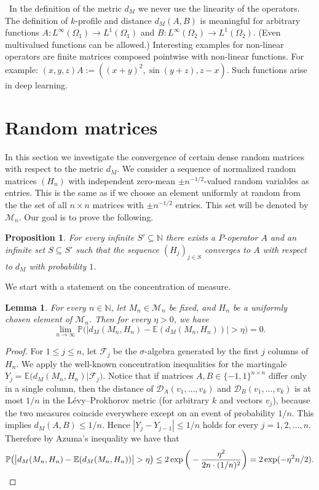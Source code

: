 \documentclass[a4wider]{amsart}
\newtheorem{lemma}[theorem]{Lemma}
\newtheorem{proposition}[theorem]{Proposition}
\theoremstyle{definitionbreak}\newtheorem{D}[theorem]{Definition}
\theoremstyle{definitionbreak}\newtheorem*{D*}{Definition}
\begin{document}
~In the definition of the metric $d_M$ we never use the linearity of the operators. The definition of $k$-profile and distance $d_M(A,B)$ is meaningful for arbitrary functions $A:L^\infty(\Omega_1)\to L^1(\Omega_1)$ and $B:L^\infty(\Omega_2)\to L^1(\Omega_2)$. (Even multivalued functions can be allowed.) Interesting examples for non-linear operators are finite matrices composed pointwise with non-linear functions. For example: $(x,y,z)A:=((x+y)^2, \sin(y+z),z-x)$. Such functions arise in deep learning.


\section{Random matrices}

In this section we investigate the convergence of certain dense random matrices with respect to the metric $d_M$. We consider a sequence of normalized random matrices $(H_n)$ with independent zero-mean $\pm n^{-1/2}$-valued random variables as entries. This is the same as if we choose an element uniformly at random from the the set of all $n\times n$ matrices with $\pm n^{-1/2}$ entries. This set will be denoted by $\mathcal M_n$. Our goal is to prove the following. 

\begin{proposition}\label{prop:wn} For every infinite $S'\subseteq \mathbb N$ there exists  a $P$-operator $A$ and an infinite set  $S\subseteq S'$   such that the sequence $(H_j)_{j\in S}$ converges to $A$ with respect to $d_M$ with probability $1$. 
\end{proposition}

We start with a statement on the concentration of measure. 

\begin{lemma} \label{lem:azuma} For every $n\in \mathbb N$, let $M_n\in \mathcal M_n$ be fixed, and $H_n$ be a uniformly chosen element of $\mathcal M_n$. Then for every $\eta>0$,  we have  
\[\lim_{n\rightarrow\infty}\mathbb P\big(\big|d_M(M_n, H_n)-\mathbb E(d_M(M_n, H_n))\big|>\eta\big)=0.\]
\end{lemma}
\begin{proof} For $1\leq j\leq n$, let $\mathcal F_j$ be the $\sigma$-algebra generated by the first $j$ columns of $H_n$. We apply the well-known concentration inequalities for the martingale $Y_j=\mathbb E\big(d_M(M_n, H_n)\big|\mathcal F_j\big)$. Notice that if matrices $A, B\in \{-1,1\}^{n\times n}$ differ only in a single column, then the distance of $\mathcal D_{A}(v_1, \ldots, v_k)$ and $\mathcal D_{B}(v_1, \ldots, v_k)$ is at most $1/n$ in the L\'evy--Prokhorov metric (for arbitrary $k$ and vectors $v_j$), because the two measures coincide everywhere except on an event of probability $1/n$.  This implies  $d_M(A, B)\leq 1/n$. Hence  $|Y_j-Y_{j-1}|\leq 1/n$ holds for every $j=1, 2, \ldots, n$. Therefore by Azuma's inequality we have that 
\[\mathbb P\big(\big|d_M(M_n, H_n)-\mathbb E(d_M(M_n, H_n))\big|>\eta\big)\leq 2\exp\bigg(-\frac{\eta^2}{2n\cdot (1/n)^2}\bigg)=2\exp(-\eta^2 n/2).\qedhere\]  
\end{proof}
\end{document}
